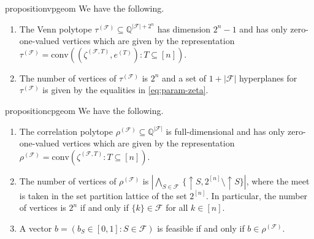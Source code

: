 \documentclass[11pt]{article}
\newcommand{\vp}{\ensuremath{\tau}}
\newcommand{\cp}{\ensuremath{\rho}}
\newcommand{\conv}{\text{conv}}
\begin{document}
\begin{restatable}{proposition}{vpgeom}
\label{prop:venn}
We have the following.
\begin{enumerate}
\item
The Venn polytope 
$\vp^{(\mathcal{F})}\subseteq\mathbb{Q}^{|\mathcal{F}|+2^n}$
has dimension $2^n-1$ and has only zero-one-valued vertices
which are given by the representation
$\vp^{(\mathcal{F})}=\conv((\zeta^{(\mathcal{F},T)},e^{(T)}):T\subseteq[n])$.
\item
The number of vertices of $\vp^{(\mathcal{F})}$ is $2^n$ and 
a set of\/ $1+|\mathcal{F}|$ hyperplanes for $\vp^{(\mathcal{F})}$
is given by the equalities in \eqref{eq:param-zeta}.
\end{enumerate}
\end{restatable}




\begin{restatable}{proposition}{cpgeom}
\label{prop:correlation}
We have the following.
\begin{enumerate}
\item
The correlation polytope 
$\cp^{(\mathcal{F})}\subseteq\mathbb{Q}^{|\mathcal{F}|}$
is full-dimensional and has only zero-one-valued vertices which are 
given by the representation 
$\cp^{(\mathcal{F})}=\conv(\zeta^{(\mathcal{F},T)}:T\subseteq [n])$.
\item
The number of vertices of $\cp^{(\mathcal{F})}$ is 
$|\!\bigwedge_{S\in\mathcal{F}}\,\{\uparrow\!S,2^{[n]}\setminus\!\uparrow\!S\}|$,
where the meet is taken in the set partition lattice of the set\/ $2^{[n]}$.
In particular, the number of vertices is $2^n$ if and only if 
$\{k\}\in\mathcal{F}$ for all $k\in[n]$. 
\item
A vector $b=(b_S\in[0,1]:S\in\mathcal{F})$ is feasible
if and only if $b\in\cp^{(\mathcal{F})}$. 
\end{enumerate}
\end{restatable}
\end{document}
